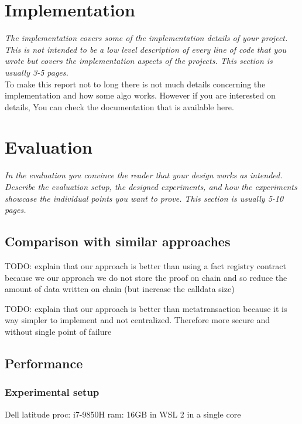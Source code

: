 \documentclass[a4paper,11pt,oneside]{report}
\begin{document}
\chapter{Implementation}

\textit{The implementation covers some of the implementation details of your project.
This is not intended to be a low level description of every line of code that
you wrote but covers the implementation aspects of the projects.
This section is usually 3-5 pages.} \\

To make this report not to long there is not much details concerning the implementation and how some algo works. However if you are interested on details, You can check the documentation that is available here.

\chapter{Evaluation}

\textit{In the evaluation you convince the reader that your design works as intended.
Describe the evaluation setup, the designed experiments, and how the
experiments showcase the individual points you want to prove.
This section is usually 5-10 pages.} \\

\section{Comparison with similar approaches}
TODO: explain that our approach is better than using a fact registry contract because we our approach we do not store the proof on chain and so reduce the amount of data written on chain (but increase the calldata size)

TODO: explain that our approach is better than metatransaction because it is way simpler to implement and not centralized. Therefore more secure and without single point of failure

\section{Performance}

\subsection{Experimental setup}
Dell latitude 
proc: i7-9850H
ram: 16GB
in WSL 2
in a single core
\end{document}
